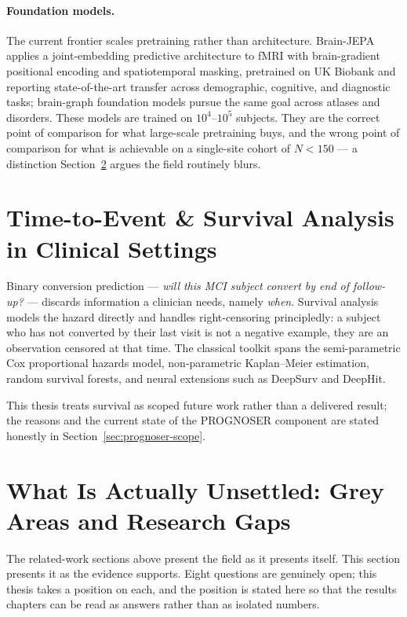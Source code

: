 \paragraph{Foundation models.} The current frontier scales pretraining rather than
architecture. Brain-JEPA applies a joint-embedding predictive architecture to fMRI with
brain-gradient positional encoding and spatiotemporal masking, pretrained on UK Biobank
and reporting state-of-the-art transfer across demographic, cognitive, and diagnostic
tasks; brain-graph foundation models pursue the same goal across atlases and disorders.
These models are trained on $10^4$--$10^5$ subjects. They are the correct point of
comparison for what large-scale pretraining buys, and the wrong point of comparison for
what is achievable on a single-site cohort of $N < 150$ --- a distinction
Section~\ref{sec:gaps} argues the field routinely blurs.

\section{Time-to-Event \& Survival Analysis in Clinical Settings}
\label{sec:survival}

Binary conversion prediction --- \emph{will this MCI subject convert by end of
follow-up?} --- discards information a clinician needs, namely \emph{when}. Survival
analysis models the hazard directly and handles right-censoring principledly: a subject
who has not converted by their last visit is not a negative example, they are an
observation censored at that time. The classical toolkit spans the semi-parametric Cox
proportional hazards model, non-parametric Kaplan--Meier estimation, random survival
forests, and neural extensions such as DeepSurv and DeepHit.

This thesis treats survival as scoped future work rather than a delivered result; the
reasons and the current state of the PROGNOSER component are stated honestly in
Section~\ref{sec:prognoser-scope}.

\section{What Is Actually Unsettled: Grey Areas and Research Gaps}
\label{sec:gaps}

The related-work sections above present the field as it presents itself. This section
presents it as the evidence supports. Eight questions are genuinely open; this thesis
takes a position on each, and the position is stated here so that the results chapters can
be read as answers rather than as isolated numbers.


